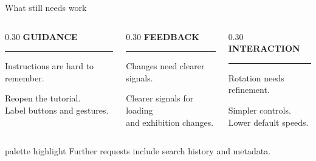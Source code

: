 \begin{frame}[c]{What still needs work}
\begin{columns}[T,onlytextwidth]
\begin{column}{0.30\textwidth}
\textcolor{unired}{\large\bfseries GUIDANCE}
\textcolor{unimint}{\rule{\linewidth}{1.6pt}}

Instructions are hard to remember.

\vspace{0.25cm}
\small Reopen the tutorial.\\Label buttons and gestures.
\end{column}
\begin{column}{0.30\textwidth}
\textcolor{unired}{\large\bfseries FEEDBACK}
\textcolor{unimint}{\rule{\linewidth}{1.6pt}}

Changes need clearer signals.

\vspace{0.25cm}
\small Clearer signals for loading\\and exhibition changes.
\end{column}
\begin{column}{0.30\textwidth}
\textcolor{unired}{\large\bfseries INTERACTION}
\textcolor{unimint}{\rule{\linewidth}{1.6pt}}

Rotation needs refinement.

\vspace{0.25cm}
\small Simpler controls.\\Lower default speeds.
\end{column}
\end{columns}
\vspace{0.5cm}
\begin{beamercolorbox}[sep=0.55em,rounded=true]{palette highlight}
\centering\small Further requests include search history and metadata.
\end{beamercolorbox}
\end{frame}
